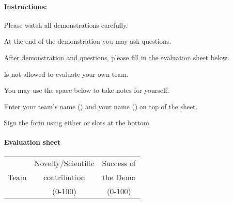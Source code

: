 \paragraph{Instructions:}
\begin{compactenum}
\item Please watch all demonstrations carefully.
\item At the end of the demonstration you may ask questions.
\item After demonstration and questions, please fill in the evaluation sheet below.
\item Is not allowed to evaluate your own team.
\item You may use the space below  to take notes for yourself.
\item Enter your team's name () and your name () on top of the sheet.
\item Sign the form using either  or  slots at the bottom.
\end{compactenum}

\paragraph{Evaluation sheet}
\begin{center}
\begingroup
\newcommand\tableTEAMS{}
\def\do#1{\appto\tableTEAMS{#1 & &  \\\hline}}%
\expandafter\docsvlist\expandafter{\TEAMSSTAGETWO}
\begin{tabular}{|l|c|c|}
	\hline
	\multirow{3}{*}{Team}
	& Novelty/Scientific & Success of \\
	&    contribution    &  the Demo  \\
	&      (0-100)       &  (0-100)   \\
	\hline
	\hline
	\tableTEAMS
\end{tabular}
\endgroup
\end{center}

